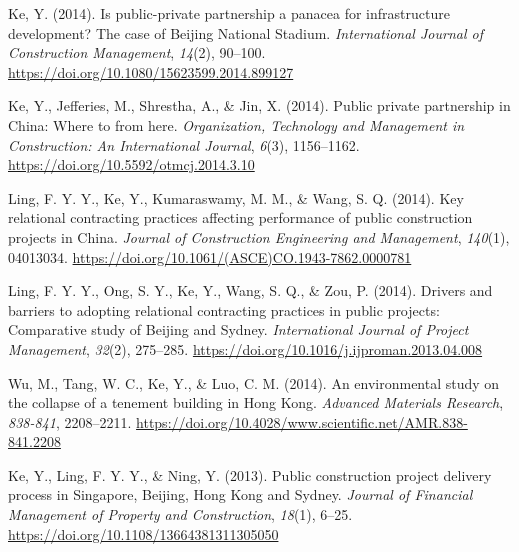 \documentclass[11pt,a4paper]{report} %
\begin{document}
\begin{tablist}
        \item[2014] \tab{}Ke, Y. (2014). Is public-private partnership a panacea for infrastructure development? The case of Beijing National Stadium. \textit{International Journal of Construction Management}, \textit{14}(2), 90--100. \href{https://doi.org/10.1080/15623599.2014.899127}{https://doi.org/10.1080/15623599.2014.899127}
        
        \item[2014] \tab{}Ke, Y., Jefferies, M., Shrestha, A., \& Jin, X. (2014). Public private partnership in China: Where to from here. \textit{Organization, Technology and Management in Construction: An International Journal}, \textit{6}(3), 1156--1162. \href{https://doi.org/10.5592/otmcj.2014.3.10}{https://doi.org/10.5592/otmcj.2014.3.10}
        
        \item[2014] \tab{}Ling, F. Y. Y., Ke, Y., Kumaraswamy, M. M., \& Wang, S. Q. (2014). Key relational contracting practices affecting performance of public construction projects in China. \textit{Journal of Construction Engineering and Management}, \textit{140}(1), 04013034. \href{https://doi.org/10.1061/(ASCE)CO.1943-7862.0000781}{https://doi.org/10.1061/(ASCE)CO.1943-7862.0000781}
        
        \item[2014] \tab{}Ling, F. Y. Y., Ong, S. Y., Ke, Y., Wang, S. Q., \& Zou, P. (2014). Drivers and barriers to adopting relational contracting practices in public projects: Comparative study of Beijing and Sydney. \textit{International Journal of Project Management}, \textit{32}(2), 275--285. \href{https://doi.org/10.1016/j.ijproman.2013.04.008}{https://doi.org/10.1016/j.ijproman.2013.04.008}
        
        \item[2014] \tab{}Wu, M., Tang, W. C., Ke, Y., \& Luo, C. M. (2014). An environmental study on the collapse of a tenement building in Hong Kong. \textit{Advanced Materials Research}, \textit{838-841}, 2208--2211. \href{https://doi.org/10.4028/www.scientific.net/AMR.838-841.2208}{https://doi.org/10.4028/www.scientific.net/AMR.838-841.2208}
        
        \item[2013] \tab{}Ke, Y., Ling, F. Y. Y., \& Ning, Y. (2013). Public construction project delivery process in Singapore, Beijing, Hong Kong and Sydney. \textit{Journal of Financial Management of Property and Construction}, \textit{18}(1), 6--25. \href{https://doi.org/10.1108/13664381311305050}{https://doi.org/10.1108/13664381311305050}
        

\end{tablist}
\end{document}
